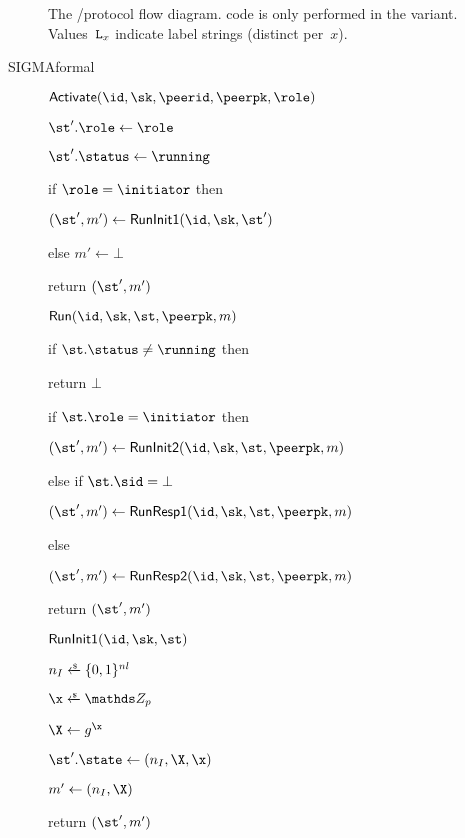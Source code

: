 \begin{figure}[t]
	\centering
	
	
	
	\caption{%
		The \SIGMA/\SIGMAI protocol flow diagram.
		 code is only performed in the \SIGMAI variant.
		Values~$\inputlabel[x]$ indicate label strings (distinct per~$x$).
	}
	\label{fig:sigma-protocol}
\end{figure}
\begin{collect*}{SIGMAformal}{}{}{}{} %
\begin{figure}[tp]
  	\begin{minipage}[t]{0.49\textwidth}
		\begin{algorithm}{$\KEActivate(\id, \sk, \peerid,\peerpk,\role)$}
			\item $\st'.\role \gets \role$
			\item $\st'.\status \gets \running$
			\item if $\role = \initiator$ then
			\item \hindent $(\st',m') \gets \RunInitI(\id,\sk,\st')$
			\item else $m' \gets \bot$
			\item return $(\st',m')$
  		\end{algorithm}

  		\ExptSepSpace

		\begin{algorithm}{$\KERun(\id,\sk,\st,\peerpk,m)$}
			\item if $\st.\status \neq \running $ then
			\item return $\bot$
			\item if $\st.\role = \initiator$ then
			\item \hindent $(\st',m') \gets \RunInit(\id,\sk,\st,\peerpk,m)$
			\item else if $\st.\sid = \bot$
			\item \hindent $(\st',m') \gets \RunRespI(\id,\sk,\st,\peerpk,m)$
			\item else
			\item \hindent $(\st',m') \gets \RunRespII(\id,\sk,\st,\peerpk,m)$
			\item return $(\st',m')$
		\end{algorithm}
		
		\ExptSepSpace
		
		\begin{algorithm}{$\RunInitI(\id,\sk,\st)$}
			\item $\nonce_I \sample \bits^{\nl}$
			\item $\x \sample \ZZ_p$
			\item $\X \gets g^{\x}$
			\item $\st'.\state \gets (\nonce_I, \X, \x)$
			\item $m' \gets (\nonce_I, \X)$
			\item return $(\st',m')$
		\end{algorithm}
		

\end{minipage}
\end{figure}
\end{collect*}
